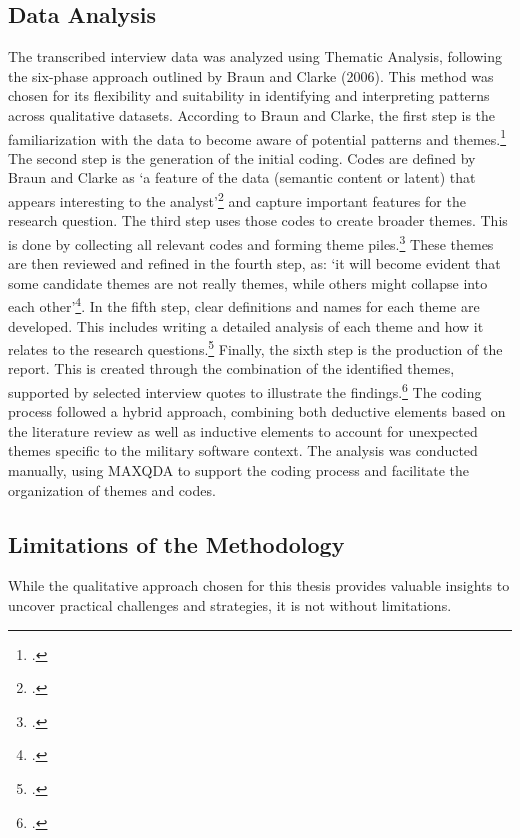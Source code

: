 \subsection{Data Analysis}
The transcribed interview data was analyzed using Thematic Analysis, following the six-phase approach outlined by Braun and Clarke (2006). This method was chosen for its flexibility and suitability in identifying and interpreting patterns across qualitative datasets.
According to Braun and Clarke, the first step is the familiarization with the data to become aware of potential patterns and themes.\footcite[16]{braunUsingThematicAnalysis2006} The second step is the generation of the initial coding. Codes are defined by Braun and Clarke as
`a feature of the data  (semantic content or latent) that appears interesting to the analyst'\footcite[18]{braunUsingThematicAnalysis2006} and capture important features for the research question. The third step uses those codes to create broader themes. This is done 
by collecting all relevant codes and forming theme piles.\footcite[19-20]{braunUsingThematicAnalysis2006} These themes are then reviewed and refined in the fourth step, as: `it will become evident that some candidate themes are not really  themes, while  others might collapse into each other'\footcite[20]{braunUsingThematicAnalysis2006}.
In the fifth step, clear definitions and names for each theme are developed. This includes writing a detailed analysis of each theme and how it relates to the research questions.\footcite[22]{braunUsingThematicAnalysis2006} 
Finally, the sixth step is the production of the report. This is created through the combination of the identified themes, supported by selected interview quotes to illustrate the findings.\footcite[23]{braunUsingThematicAnalysis2006}
The coding process followed a hybrid approach, combining both deductive elements based on the literature review as well as inductive elements to account for unexpected themes specific to the military software context. The analysis was conducted manually, using MAXQDA to support the coding process and facilitate the organization of themes and codes.\\
\subsection{Limitations of the Methodology}
While the qualitative approach chosen for this thesis provides valuable insights to uncover practical challenges and strategies, it is not without limitations.\\

